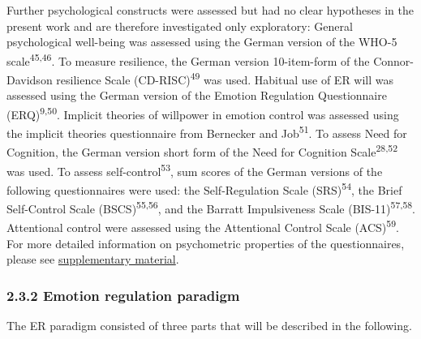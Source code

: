 \documentclass[
  man,floatsintext]{apa6}
\begin{document}
Further psychological constructs were assessed but had no clear hypotheses in the present work and are therefore investigated only exploratory:
General psychological well-being was assessed using the German version of the WHO-5 scale\textsuperscript{45,46}.
To measure resilience, the German version 10-item-form of the Connor-Davidson resilience Scale (CD-RISC)\textsuperscript{49} was used.
Habitual use of ER will was assessed using the German version of the Emotion Regulation Questionnaire (ERQ)\textsuperscript{9,50}.
Implicit theories of willpower in emotion control was assessed using the implicit theories questionnaire from Bernecker and Job\textsuperscript{51}.
To assess Need for Cognition, the German version short form of the Need for Cognition Scale\textsuperscript{28,52} was used.
To assess self-control\textsuperscript{53}, sum scores of the German versions of the following questionnaires were used: the Self-Regulation Scale (SRS)\textsuperscript{54}, the Brief Self-Control Scale (BSCS)\textsuperscript{55,56}, and the Barratt Impulsiveness Scale (BIS-11)\textsuperscript{57,58}.
Attentional control were assessed using the Attentional Control Scale (ACS)\textsuperscript{59}.
For more detailed information on psychometric properties of the questionnaires, please see \protect\hyperlink{SupplementQuestionnaires}{supplementary material}.

\hypertarget{emotion-regulation-paradigm}{%
\subsubsection{2.3.2 Emotion regulation paradigm}\label{emotion-regulation-paradigm}}

The ER paradigm consisted of three parts that will be described in the following.
\end{document}
